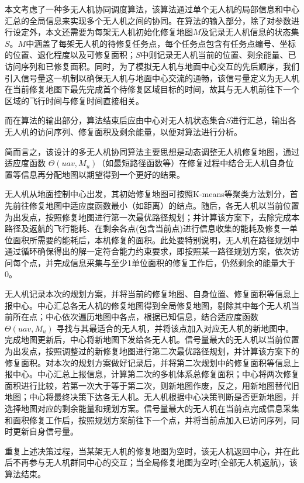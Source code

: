 \documentclass[AutoFakeBold]{LZUThesis}
\begin{document}
本文考虑了一种多无人机协同调度算法，该算法通过单个无人机的局部信息和中心汇总的全局信息来实现多个无人机之间的协同。在算法的输入部分，除了对参数进行设定外，本文还需要为每架无人机初始化修复地图$M$及记录无人机信息的状态集$S$。$M$中涵盖了每架无人机的待修复任务点，每个任务点包含有任务点编号、坐标的位置、退化程度以及可修复面积；$S$中则记录无人机当前的位置、剩余能量、已访问序列和已修复面积。同时，为了模拟无人机与地面中心交互的先后顺序，我们引入信号量这一机制以确保无人机与地面中心交流的通畅，该信号量定义为无人机在当前修复地图下最先完成首个待修复区域目标的时间，故其与无人机前往下一个区域的飞行时间与修复时间直接相关。

而在算法的输出部分，算法结束后应由中心对无人机状态集合$S$进行汇总，输出各无人机的访问序列、修复面积及剩余能量，以便对算法进行分析。

简而言之，该设计的多无人机协同算法主要思想是动态调整无人机修复地图，通过适应度函数 $\Theta(uav,M_u)$（如最短路径函数等）在修复过程中结合无人机自身位置等信息再分配地图以期望得到一个更好的结果。

无人机从地面控制中心出发，其初始修复地图可按照K-means等聚类方法划分，首先前往修复地图中适应度函数最小（如距离）的结点。随后，各无人机以当前位置为出发点，按照修复地图进行第一次最优路径规划；并计算该方案下，去除完成本路径及返航的飞行能耗、在剩余各点(包含当前点)进行信息收集的能耗及修复一单位面积所需要的能耗后，本机修复的面积。此处要特别说明，无人机在路径规划中通过循环确保得出的解一定符合能力约束要求，即按照某一路径规划方案，依次访问每个点，并完成信息采集与至少1单位面积的修复工作后，仍然剩余的能量大于0。

无人机记录本次的规划方案，并将当前的修复地图、自身位置、修复面积等信息上报中心。中心汇总各无人机的修复地图得到全局修复地图，剔除其中每个无人机当前所在点；中心依次遍历地图中各点，根据已知信息，结合适应度函数 $\Theta(uav,M_u)$ 寻找与其最适合的无人机，并将该点加入对应无人机的新地图中。完成地图更新后，中心将新地图下发给各无人机。信号量最大的无人机以当前位置为出发点，按照调整过的新修复地图进行第二次最优路径规划，并计算该方案下的修复面积。对本次的规划方案做好记录后，并将第二次规划中的修复面积等信息上报中心。中心汇总上报信息，计算第二次的多机体系总修复面积；中心将两次修复面积进行比较，若第一次大于等于第二次，则新地图作废，反之，用新地图替代旧地图；中心将最终决策下达各无人机。无人机根据中心决策判断是否更新地图，并选择地图对应的剩余能量和规划方案。信号量最大的无人机在当前点完成信息采集和面积修复工作后，按照规划方案前往下一个点，并将当前点加入已访问序列，同时更新自身信号量。

重复上述决策过程，当某架无人机的修复地图为空时，该无人机返回中心，并在此后不再参与无人机群同中心的交互；当全局修复地图为空时(全部无人机返航)，该算法结束。
\end{document}
